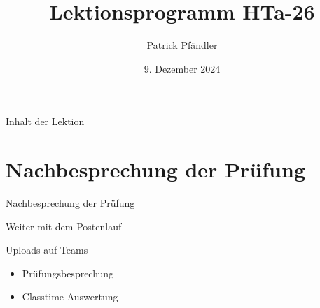 





\title{\textbf{Lektionsprogramm HTa-26}}
\author{Patrick Pfändler}
\date{9. Dezember 2024}




\frame{\titlepage}

\begin{frame}{Inhalt der Lektion}
	\tableofcontents
\end{frame}


\section{Nachbesprechung der Prüfung}
\begin{frame}{Nachbesprechung der Prüfung}
\end{frame}



\begin{frame}{Weiter mit dem Postenlauf}
\end{frame}







\begin{frame}{Uploads auf Teams}
	\begin{itemize}
		\item[\textbullet] Prüfungsbesprechung 
		\item[\textbullet] Classtime Auswertung
	\end{itemize}
	
\end{frame}

\folieFragen
{}

